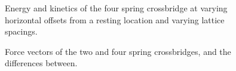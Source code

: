 \documentclass[]{article}
\begin{document}
\begin{figure}[p]
    \begin{center}
    \label{fig:4s}
    \caption{
        Energy and kinetics of the four spring crossbridge at varying horizontal offsets from a resting location and varying lattice spacings.}
    \end{center}
\end{figure}

\begin{figure}[p]
    \begin{center}
    \label{fig:force}
    \caption{
        Force vectors of the two and four spring crossbridges, and the differences between.}
    \end{center}
\end{figure}





\end{document}
